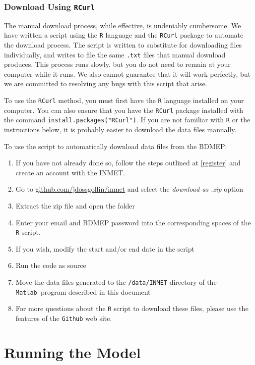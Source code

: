 \documentclass[11pt]{article} %
\newcommand{\fn}[1]{\texttt{#1}} %
\newcommand{\code}[1]{\texttt{#1}} %
\newcommand{\mtlb}{\texttt{Matlab\ }}
\newcommand{\usee}[1]{\textit{#1}} %
\begin{document}
\subsubsection{Download Using \code{RCurl}}

The manual download process, while effective, is undeniably cumbersome.
We have written a script using the \code{R} language and the  \code{RCurl} package to automate the download process.
The script is written to substitute for downloading files individually, and writes to file the same \code{.txt} files that manual download produces.
This process runs slowly, but you do not need to remain at your computer while it runs.
We also cannot guarantee that it will work perfectly, but we are committed to resolving any bugs with this script that arise.

To use the \code{RCurl} method, you must first have the \code{R} language installed on your computer. You can also ensure that you have the \code{RCurl} package installed with the command \code{install.packages("RCurl")}. If you are not familiar with \code{R} or the instructions below, it is probably easier to download the data files manually.

To use the script to automatically download data files from the \ac{BDMEP}:

\begin{enumerate}
\item If you have not already done so, follow the steps outlined at \cref{register} and create an account with the \ac{INMET}.
\item Go to \url{github.com/jdossgollin/inmet} and select the \usee{download as .zip} option
\item Extract the zip file and open the folder
\item Enter your email and \ac{BDMEP} password into the corresponding spaces of the \code{R} script.
\item If you wish, modify the start and/or end date in the script
\item Run the code as source
\item Move the data files generated to the \fn{/data/INMET} directory of the \mtlb program described in this document
\item For more questions about the \code{R} script to download these files, please use the features of the \fn{Github} web site.
\end{enumerate}


\section{Running the Model}
\end{document}
